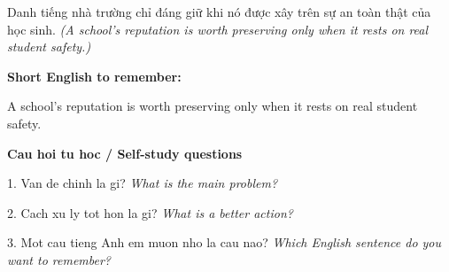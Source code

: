 \begin{baihoc}
Danh tiếng nhà trường chỉ đáng giữ khi nó được xây trên sự an toàn thật của học sinh.
\textit{(A school’s reputation is worth preserving only when it rests on real student safety.)}
\end{baihoc}

\begin{ghinhoanh}
\textbf{Short English to remember:}

A school’s reputation is worth preserving only when it rests on real student safety.

\end{ghinhoanh}

\begin{tuhocnhanh}
\textbf{Cau hoi tu hoc / Self-study questions}

1. Van de chinh la gi? \textit{What is the main problem?}

2. Cach xu ly tot hon la gi? \textit{What is a better action?}

3. Mot cau tieng Anh em muon nho la cau nao? \textit{Which English sentence do you want to remember?}
\end{tuhocnhanh}
